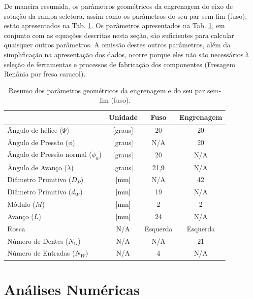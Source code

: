 De maneira resumida, os parâmetros geométricos da engrenagem do eixo de rotação da rampa seletora, assim como os parâmetros do seu par sem-fim (fuso), estão apresentados na Tab. \ref{tab:resumo_p}. Os parâmetros apresentados na Tab. \ref{tab:resumo_p}, em conjunto com as equações descritas nesta seção, são suficientes para calcular quaisquer outros parâmetros. A omissão destes outros parâmetros, além da simplificação na apresentação dos dados, ocorre porque eles não são necessários à seleção de ferramentas e processos de fabricação dos componentes (Fresagem Renânia por fresa caracol).

\begin{table}[!htb]
     \centering
     \caption{Resumo dos parâmetros geométricos da engrenagem e do seu par sem-fim (fuso).}
    \centering
     \begin{tabular}{|l|c|c|c|}
     \rowcolor[HTML]{A8DADC}
       \hline
       \multicolumn{1}{|c|}{\textbf{Parâmetro}} &
      \multicolumn{1}{c|}{\textbf{Unidade}} &
       \textbf{Fuso} &
        \textbf{Engrenagem} \\ \hline
        Ângulo de hélice ($\Psi$) & [graus] & 20 & 20 \\ \hline
        Ângulo de Pressão ($\phi$) & [graus] & N/A & 20 \\ \hline
        Ângulo de Pressão normal ($\phi_n$) &[graus] & 20 & N/A \\ \hline
        Ângulo de Avanço ($\lambda$) & [graus]& 21,9 & N/A \\ \hline
        Diâmetro Primitivo ($D_P$) & [mm] & N/A & 42 \\ \hline
        Diâmetro Primitivo ($d_W$) & [mm] & 19 & N/A \\ \hline
        Módulo ($M$) & [mm]& 2 & 2 \\ \hline
        Avanço ($L$) & [mm]& 24 & N/A \\ \hline
        Rosca & \multicolumn{1}{c|}{N/A} & Esquerda & Esquerda \\ \hline
        Número de Dentes ($N_G$) & \multicolumn{1}{c|}{N/A} & N/A & 21 \\ \hline
        Número de Entradas ($N_W$) & \multicolumn{1}{c|}{N/A} & 4 & N/A \\ \hline
        \end{tabular}
     \label{tab:resumo_p}
     
\end{table}


\section{Análises Numéricas}

